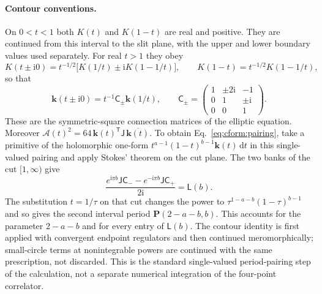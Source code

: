 \documentclass[11pt,a4paper]{article}
\numberwithin{equation}{section}
\newcommand{\dd}{\,\mathrm d}
\begin{document}
\paragraph{Contour conventions.} On $0<t<1$ both $K(t)$ and $K(1-t)$ are real and positive. They are continued from this
interval to the slit plane, with the upper and lower boundary values used separately. For real $t>1$ they obey
\begin{equation}
 K(t\pm\mathrm i0)=t^{-1/2}\bigl[K(1/t)\pm\mathrm iK(1-1/t)\bigr],\qquad K(1-t)=t^{-1/2}K(1-1/t),
\end{equation}
so that
\begin{equation}
 \mathbf k(t\pm\mathrm i0)=t^{-1}\mathsf C_\pm\mathbf k(1/t),\qquad
 \mathsf C_\pm=\begin{pmatrix}1&\pm2\mathrm i&-1\\0&1&\pm\mathrm i\\0&0&1\end{pmatrix}.
 \label{eq:cform:boundary}
\end{equation}
These are the symmetric-square connection matrices of the elliptic equation. Moreover
$\mathcal A(t)^2=64\,\mathbf k(t)^{\mathsf T}\mathsf J\,\overline{\mathbf k(t)}$. To obtain
Eq.~\eqref{eq:cform:pairing}, take a primitive of the holomorphic one-form $t^{a-1}(1-t)^{b-1}\mathbf k(t)\dd t$ in
this single-valued pairing and apply Stokes' theorem on the cut plane. The two banks of the cut $[1,\infty)$ give
\begin{equation}
 \frac{e^{\mathrm i\pi b}\mathsf J\mathsf C_--e^{-\mathrm i\pi b}\mathsf J\mathsf C_+}{2\mathrm i}=\mathsf L(b).
\end{equation}
The substitution $t=1/\tau$ on that cut changes the power to $\tau^{1-a-b}(1-\tau)^{b-1}$ and so gives the second
interval period $\mathbf P(2-a-b,b)$. This accounts for the parameter $2-a-b$ and for every entry of $\mathsf L(b)$.
The contour identity is first applied with convergent endpoint regulators and then continued meromorphically;
small-circle terms at nonintegrable powers are continued with the same prescription, not discarded. This is the
standard single-valued period-pairing step of the calculation, not a separate numerical integration of the four-point
correlator.

\end{document}
